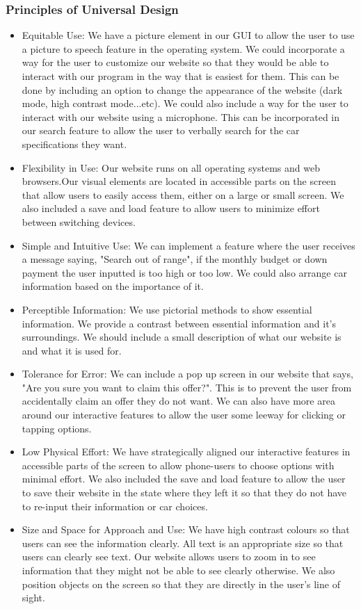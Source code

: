 \documentclass[fontsize=14pt]{article}
\begin{document}
\subsubsection*{Principles of Universal Design}
\begin{itemize}
    \item Equitable Use: We have a picture element in our GUI to allow the user to use a picture to speech feature in the operating system. We could incorporate a way for the user to customize our website so that they would be able to interact with our program in the way that is easiest for them. This can be done by including an option to change the appearance of the website (dark mode, high contrast mode...etc). We could also include a way for the user to interact with our website using a microphone. This can be incorporated in our search feature to allow the user to verbally search for the car specifications they want.
    \item Flexibility in Use: Our website runs on all operating systems and web browsers.Our visual elements are located in accessible parts on the screen that allow users to easily access them, either on a large or small screen. We also included a save and load feature to allow users to minimize effort between switching devices.
    \item Simple and Intuitive Use: We can implement a feature where the user receives a message saying, "Search out of range", if the monthly budget or down payment the user inputted is too high or too low. We could also arrange car information based on the importance of it.
    \item Perceptible Information: We use pictorial methods to show essential information. We provide a contrast between essential information and it's surroundings. We should include a small description of what our website is and what it is used for.
    \item Tolerance for Error: We can include a pop up screen in our website that says, "Are you sure you want to claim this offer?". This is to prevent the user from accidentally claim an offer they do not want. We can also have more area around our interactive features to allow the user some leeway for clicking or tapping options.
    \item Low Physical Effort: We have strategically aligned our interactive features in accessible parts of the screen to allow phone-users to choose options with minimal effort. We also included the save and load feature to allow the user to save their website in the state where they left it so that they do not have to re-input their information or car choices.
    \item Size and Space for Approach and Use: We have high contrast colours so that users can see the information clearly. All text is an appropriate size so that users can clearly see text. Our website allows users to zoom in to see information that they might not be able to see clearly otherwise. We also position objects on the screen so that they are directly in the user's line of sight.
\end{itemize}
\end{document}
